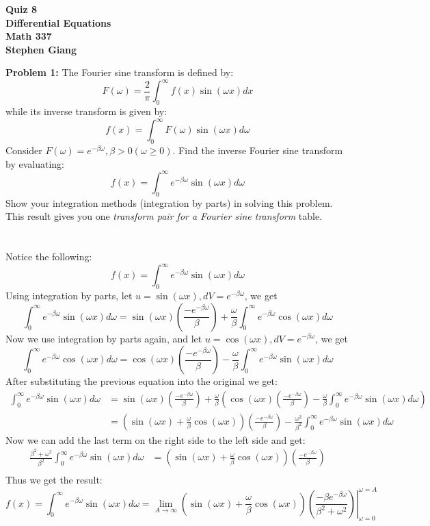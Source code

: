 \documentclass[12pt]{article}
\begin{document}
	
	\begin{center}
		\textbf{Quiz 8} \\
		\textbf{Differential Equations} \\
		\textbf{Math 337} \\
		\textbf{Stephen Giang} \\
	\end{center}

\noindent \textbf{Problem 1: }The Fourier sine transform is defined by:
	$$
	F(\omega) = \frac{2}{\pi} \int_{0}^{\infty} f(x)\sin(\omega x)dx
	$$
while its inverse transform is given by:
	$$
	f(x) = \int_{0}^{\infty} F(\omega)\sin(\omega x)d\omega 
	$$
Consider $F(\omega) = e^{-\beta \omega}, \beta > 0 (\omega \geq 0)$. Find the inverse Fourier sine transform by evaluating:
	$$
	f(x) = \int_{0}^{\infty} e^{-\beta \omega}\sin(\omega x)d\omega 
	$$
Show your integration methods (integration by parts) in solving this problem. This result gives
you one \textit{transform pair for a Fourier sine transform} table.  
\\ \\ \\
Notice the following:
	$$
	f(x) = \int_{0}^{\infty} e^{-\beta \omega}\sin(\omega x)d\omega
	$$
Using integration by parts, let $u = \sin(\omega x), dV = e^{-\beta \omega}$, we get
	$$
	\int_{0}^{\infty} e^{-\beta \omega}\sin(\omega x)d\omega = \sin(\omega x)\left(\frac{-e^{-\beta \omega}}{\beta}\right) + \frac{\omega}{\beta}\int_{0}^{\infty} e^{-\beta \omega} \cos(\omega x)d\omega 
	$$
Now we use integration by parts again, and let $u = \cos(\omega x), dV = e^{-\beta \omega}$, we get
	$$
	\int_{0}^{\infty} e^{-\beta \omega} \cos(\omega x)d\omega = \cos(\omega x)\left(\frac{-e^{-\beta \omega}}{\beta}\right) - \frac{\omega}{\beta}\int_{0}^{\infty} e^{-\beta \omega} \sin(\omega x)d\omega 
	$$
After substituting the previous equation into the original we get:
	\begin{align*}
		\int_{0}^{\infty} e^{-\beta \omega}\sin(\omega x)d\omega &= \sin(\omega x)\left(\frac{-e^{-\beta \omega}}{\beta}\right) + \frac{\omega}{\beta}\left(\cos(\omega x)\left(\frac{-e^{-\beta \omega}}{\beta}\right) - \frac{\omega}{\beta}\int_{0}^{\infty} e^{-\beta \omega} \sin(\omega x)d\omega\right)\\
		&= \left(\sin(\omega x) + \frac{\omega}{\beta} \cos(\omega x)\right)\left(\frac{-e^{-\beta \omega}}{\beta}\right) - \frac{\omega^2}{\beta^2}\int_{0}^{\infty} e^{-\beta \omega} \sin(\omega x)d\omega 
	\end{align*}
Now we can add the last term on the right side to the left side and get:
	\begin{align*}
		\frac{\beta^2 + \omega^2}{\beta^2}\int_{0}^{\infty} e^{-\beta \omega}\sin(\omega x)d\omega &= \left(\sin(\omega x) + \frac{\omega}{\beta} \cos(\omega x)\right)\left(\frac{-e^{-\beta \omega}}{\beta}\right) \\
	\end{align*}
Thus we get the result:
	$$
	f(x) = \int_{0}^{\infty} e^{-\beta \omega}\sin(\omega x)d\omega = \lim\limits_{A \rightarrow \infty} \left.\left(\sin(\omega x) + \frac{\omega}{\beta} \cos(\omega x)\right)\left(\frac{-\beta e^{-\beta \omega}}{\beta^2 + \omega^2}\right)\right|^{\omega = A}_{\omega = 0}
	$$
	
\end{document}
